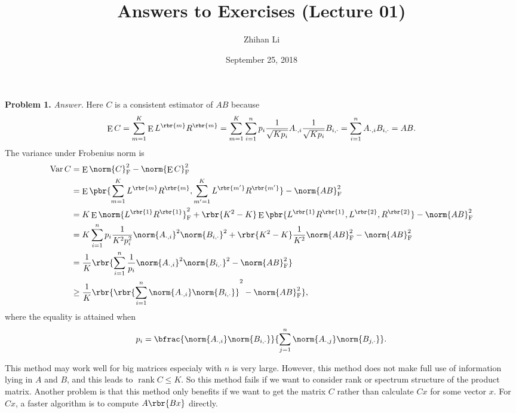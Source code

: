 \documentclass[english, nochinese]{pnote}
\title{Answers to Exercises (Lecture 01)}
\author{Zhihan Li}
\date{September 25, 2018}
\DeclareMathOperator\ope{\mathrm{E}}
\DeclareMathOperator\opvar{\mathrm{Var}}
\DeclareMathOperator\oprank{\mathrm{rank}}
\begin{document}
\maketitle

\textbf{Problem 1.} \textit{Answer.} Here $C$ is a consistent estimator of $ A B $ because
\begin{equation}
\ope C = \sum_{ m = 1 }^K \ope L^{\rbr{m}} R^{\rbr{m}} = \sum_{ m = 1 }^K \sum_{ i = 1 }^n p_i \frac{1}{\sqrt{ K p_i }} A_{ \cdot, i } \frac{1}{\sqrt{ K p_i }} B_{ i, \cdot } = \sum_{ i = 1 }^n A_{ \cdot, i } B_{ i, \cdot } = A B.
\end{equation}
The variance under Frobenius norm is
\begin{equation}
\begin{split}
\opvar C &= \ope \norm{C}_{\text{F}}^2 - \norm{ \ope C }_{\text{F}}^2 \\
&= \ope \pbr{ \sum_{ m = 1 }^K L^{\rbr{m}} R^{\rbr{m}}, \sum_{ m' = 1 }^K L^{\rbr{m'}} R^{\rbr{m'}} } - \norm{ A B }_{\text{F}}^2 \\
&= K \ope \norm{ L^{\rbr{1}} R^{\rbr{1}} }_{\text{F}}^2 + \rbr{ K^2 - K } \ope \pbr{ L^{\rbr{1}} R^{\rbr{1}}, L^{\rbr{2}}, R^{\rbr{2}} } -\norm{ A B }_{\text{F}}^2 \\
&= K \sum_{ i = 1 }^n p_i \frac{1}{ K^2  p_i^2} \norm{A_{ \cdot, i }}^2 \norm{B_{ i, \cdot }}^2 + \rbr{ K^2 - K } \frac{1}{K^2} \norm{ A B }_{\text{F}}^2 - \norm{ A B }_{\text{F}}^2 \\
&= \frac{1}{K} \rbr{ \sum_{ i = 1 }^n \frac{1}{p_i} \norm{A_{ \cdot, i }}^2 \norm{B_{ i, \cdot }}^2 - \norm{ A B }_{\text{F}}^2 } \\
&\ge \frac{1}{K} \rbr{ \rbr{ \sum_{ i = 1 }^n \norm{A_{ \cdot, i }} \norm{B_{ i, \cdot }} }^2 - \norm{ A B }_{\text{F}}^2 },
\end{split}
\end{equation}
where the equality is attained when
\begin{equation}
p_i = \bfrac{ \norm{A_{ \cdot, i }} \norm{B_{ i, \cdot }} }{ \sum_{ j = 1 }^n \norm{A_{ \cdot, j }} \norm{B_{ j, \cdot }} }.
\end{equation}

This method may work well for big matrices especialy with $n$ is very large. However, this method does not make full use of information lying in $A$ and $B$, and this leads to $ \oprank C \le K $. So this method fails if we want to consider rank or spectrum structure of the product matrix. Another problem is that this method only benefits if we want to get the matrix $C$ rather than calculate $ C x $ for some vector $x$. For $ C x $, a faster algorithm is to compute $ A \rbr{ B x } $ directly.
\end{document}
